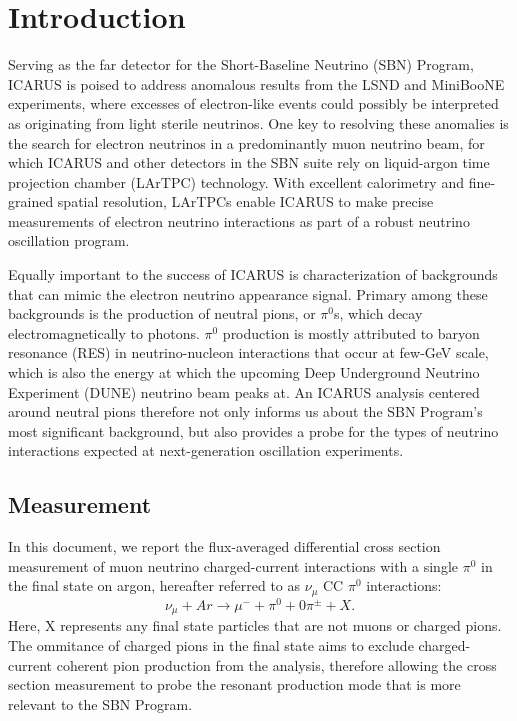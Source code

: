 \documentclass[../main.tex]{subfiles}
\begin{document}
\section{Introduction}
\label{sec:intro}

Serving as the far detector for the Short-Baseline Neutrino (SBN) Program, ICARUS is poised to address anomalous results from the LSND and MiniBooNE experiments, where excesses of electron-like events could possibly be interpreted as originating from light sterile neutrinos. One key to resolving these anomalies is the search for electron neutrinos in a predominantly muon neutrino beam, for which ICARUS and other detectors in the SBN suite rely on liquid-argon time projection chamber (LArTPC) technology.  With excellent calorimetry and fine-grained spatial resolution, LArTPCs enable ICARUS to make precise measurements of electron neutrino interactions as part of a robust neutrino oscillation program.

Equally important to the success of ICARUS is characterization of backgrounds that can mimic the electron neutrino appearance signal.  Primary among these backgrounds is the production of neutral pions, or $\pi^{0}$s, which decay electromagnetically to photons.  $\pi^{0}$ production is mostly attributed to baryon resonance (RES) in neutrino-nucleon interactions that occur at few-GeV scale, which is also the energy at which the upcoming Deep Underground Neutrino Experiment (DUNE) neutrino beam peaks at.  An ICARUS analysis centered around neutral pions therefore not only informs us about the SBN Program's most significant background, but also provides a probe for the types of neutrino interactions expected at next-generation oscillation experiments.

\subsection{Measurement}
In this document, we report the flux-averaged differential cross section measurement of muon neutrino charged-current interactions with a single $\pi^{0}$ in the final state on argon, hereafter referred to as $\nu_{\mu}$ CC $\pi^{0}$ interactions:
\begin{equation}
    \nu_{\mu} + Ar \rightarrow \mu^{-} + \pi^{0} + 0\pi^{\pm} + X.
\end{equation}
Here, X represents any final state particles that are not muons or charged pions.  The ommitance of charged pions in the final state aims to exclude charged-current coherent pion production from the analysis, therefore allowing the cross section measurement to probe the resonant production mode that is more relevant to the SBN Program.
\end{document}
